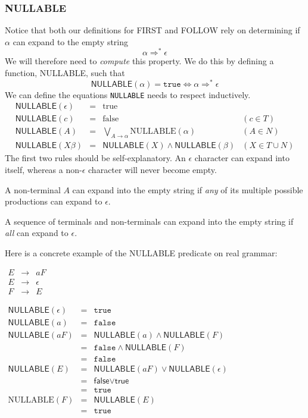 \subsubsection{NULLABLE}
Notice that both our definitions for \textsf{FIRST} and \textsf{FOLLOW} rely on determining if $\alpha$ can expand to the empty string
\[\alpha \Rightarrow^* \epsilon\]
We will therefore need to \textit{compute} this property. We do this by defining a function, \textsf{NULLABLE}, such that 
\[\textsf{NULLABLE}(\alpha) = \texttt{true} \iff \alpha \Rightarrow^* \epsilon\]
We can define the equations \texttt{NULLABLE} needs to respect inductively.
\[
\begin{array}{lcll}
\textsf{NULLABLE}(\epsilon) &=& \text{true}\\[1ex]
\textsf{NULLABLE}(c) &=& \text{false} & (c \in T)\\[1ex]
\textsf{NULLABLE}(A) &=& \bigvee_{A \to \alpha} \text{NULLABLE}(\alpha) & (A \in N)\\[1ex]
\textsf{NULLABLE}(X\beta) &=& \textsf{NULLABLE}(X) \wedge \textsf{NULLABLE}(\beta) & (X \in T \cup N)
\end{array}
\]
The first two rules should be self-explanatory. An $\epsilon$ character can expand into itself, whereas a non-$\epsilon$ character will never become empty.

A non-terminal $A$ can expand into the empty string if \textit{any} of its multiple possible productions can expand to $\epsilon$.

A sequence of terminals and non-terminals can expand into the empty string if \textit{all} can expand to $\epsilon$.

Here is a concrete example of the \textsf{NULLABLE} predicate on real grammar:

\begin{minipage}{0.4\textwidth}
$\begin{array}{rcl}
E &\to& a F \\
E &\to& \epsilon \\
F &\to& E
\end{array}$
\end{minipage}%
\begin{minipage}{0.6\textwidth}\footnotesize
  $\begin{array}{lcl}
\textsf{NULLABLE}(\epsilon) &=& \texttt{true}\\[1ex]
\textsf{NULLABLE}(a) &=& \texttt{false}\\[1ex]
\textsf{NULLABLE}(a F) &=& \textsf{NULLABLE} (a) \wedge \textsf{NULLABLE} (F) \\
              &=& \texttt{false} \wedge \textsf{NULLABLE} (F)\\
              &=& \texttt{false}\\[1ex]
\textsf{NULLABLE}(E) &=& \textsf{NULLABLE} (a F) \vee \textsf{NULLABLE} (\epsilon)\\
            &=& \textsf{false} \vee \textsf{true}\\
            &=& \texttt{true}\\[1ex]
\text{NULLABLE} (F) &=& \textsf{NULLABLE} (E)\\
            &=& \texttt{true}
\end{array}$ 
\end{minipage}

